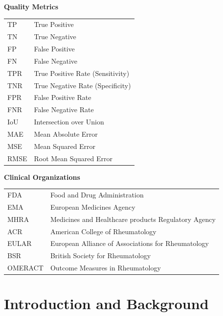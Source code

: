 \documentclass[12pt, a4paper]{article}
\begin{document}
\vspace{0.5cm}
\textbf{Quality Metrics}

\begin{tabular}{ll}
TP & True Positive \\
TN & True Negative \\
FP & False Positive \\
FN & False Negative \\
TPR & True Positive Rate (Sensitivity) \\
TNR & True Negative Rate (Specificity) \\
FPR & False Positive Rate \\
FNR & False Negative Rate \\
IoU & Intersection over Union \\
MAE & Mean Absolute Error \\
MSE & Mean Squared Error \\
RMSE & Root Mean Squared Error \\
\end{tabular}

\vspace{0.5cm}
\textbf{Clinical Organizations}

\begin{tabular}{ll}
FDA & Food and Drug Administration \\
EMA & European Medicines Agency \\
MHRA & Medicines and Healthcare products Regulatory Agency \\
ACR & American College of Rheumatology \\
EULAR & European Alliance of Associations for Rheumatology \\
BSR & British Society for Rheumatology \\
OMERACT & Outcome Measures in Rheumatology \\
\end{tabular}

\section{Introduction and Background}
\end{document}
